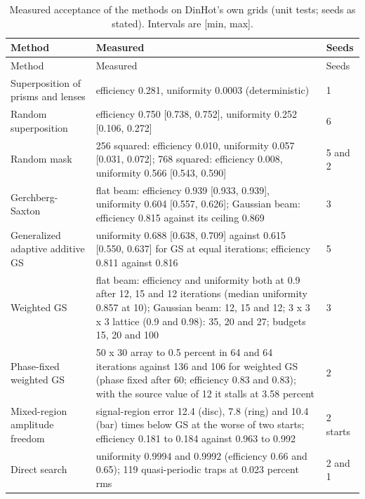 \begin{longtable}{@{}>{\raggedright\arraybackslash}p{} p{} p{}@{}}
\caption{Measured acceptance of the methods on DinHot's own grids (unit tests; seeds as stated). Intervals are [min, max].}\label{tab:acceptance}\\
\toprule Method & Measured & Seeds\\\midrule\endfirsthead
\toprule Method & Measured & Seeds\\\midrule\endhead
\footnotesize Superposition of prisms and lenses & \footnotesize efficiency 0.281, uniformity 0.0003 (deterministic) & \footnotesize 1\\
\footnotesize Random superposition & \footnotesize efficiency 0.750 [0.738, 0.752], uniformity 0.252 [0.106, 0.272] & \footnotesize 6\\
\footnotesize Random mask & \footnotesize 256 squared: efficiency 0.010, uniformity 0.057 [0.031, 0.072]; 768 squared: efficiency 0.008, uniformity 0.566 [0.543, 0.590] & \footnotesize 5 and 2\\
\footnotesize Gerchberg-Saxton & \footnotesize flat beam: efficiency 0.939 [0.933, 0.939], uniformity 0.604 [0.557, 0.626]; Gaussian beam: efficiency 0.815 against its ceiling 0.869 & \footnotesize 3\\
\footnotesize Generalized adaptive additive GS & \footnotesize uniformity 0.688 [0.638, 0.709] against 0.615 [0.550, 0.637] for GS at equal iterations; efficiency 0.811 against 0.816 & \footnotesize 5\\
\footnotesize Weighted GS & \footnotesize flat beam: efficiency and uniformity both at 0.9 after 12, 15 and 12 iterations (median uniformity 0.857 at 10); Gaussian beam: 12, 15 and 12; 3 x 3 x 3 lattice (0.9 and 0.98): 35, 20 and 27; budgets 15, 20 and 100 & \footnotesize 3\\
\footnotesize Phase-fixed weighted GS & \footnotesize 50 x 30 array to 0.5 percent in 64 and 64 iterations against 136 and 106 for weighted GS (phase fixed after 60; efficiency 0.83 and 0.83); with the source value of 12 it stalls at 3.58 percent & \footnotesize 2\\
\footnotesize Mixed-region amplitude freedom & \footnotesize signal-region error 12.4 (disc), 7.8 (ring) and 10.4 (bar) times below GS at the worse of two starts; efficiency 0.181 to 0.184 against 0.963 to 0.992 & \footnotesize 2 starts\\
\footnotesize Direct search & \footnotesize uniformity 0.9994 and 0.9992 (efficiency 0.66 and 0.65); 119 quasi-periodic traps at 0.023 percent rms & \footnotesize 2 and 1\\

\end{longtable}
